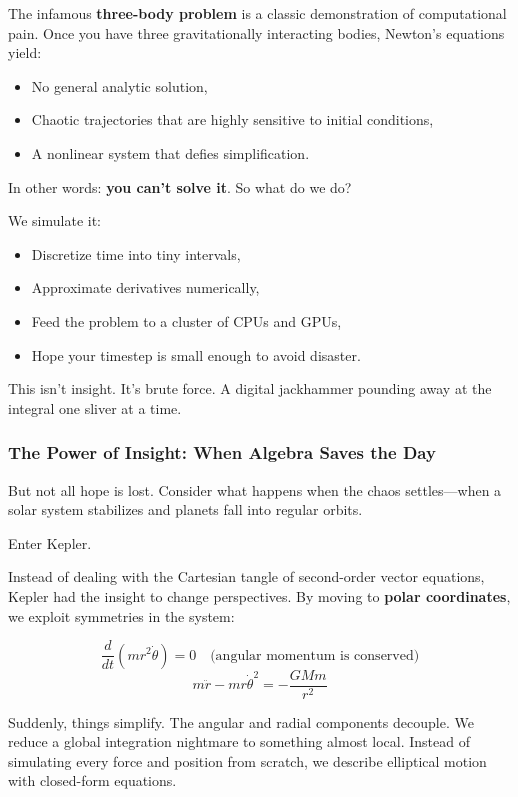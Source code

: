 The infamous \textbf{three-body problem} is a classic demonstration of computational pain. Once you have three gravitationally interacting bodies, Newton’s equations yield:

\begin{itemize}
  \item No general analytic solution,
  \item Chaotic trajectories that are highly sensitive to initial conditions,
  \item A nonlinear system that defies simplification.
\end{itemize}

In other words: \textbf{you can’t solve it}. So what do we do?

We simulate it:

\begin{itemize}
  \item Discretize time into tiny intervals,
  \item Approximate derivatives numerically,
  \item Feed the problem to a cluster of CPUs and GPUs,
  \item Hope your timestep is small enough to avoid disaster.
\end{itemize}

This isn’t insight. It’s brute force. A digital jackhammer pounding away at the integral one sliver at a time.

\subsubsection{The Power of Insight: When Algebra Saves the Day}

But not all hope is lost. Consider what happens when the chaos settles—when a solar system stabilizes and planets fall into regular orbits.

Enter Kepler.

Instead of dealing with the Cartesian tangle of second-order vector equations, Kepler had the insight to change perspectives. By moving to \textbf{polar coordinates}, we exploit symmetries in the system:

\[
\frac{d}{dt}(m r^2 \dot{\theta}) = 0 \quad \text{(angular momentum is conserved)}
\]
\[
m \ddot{r} - m r \dot{\theta}^2 = -\frac{GMm}{r^2}
\]

Suddenly, things simplify. The angular and radial components decouple. We reduce a global integration nightmare to something almost local. Instead of simulating every force and position from scratch, we describe elliptical motion with closed-form equations.

